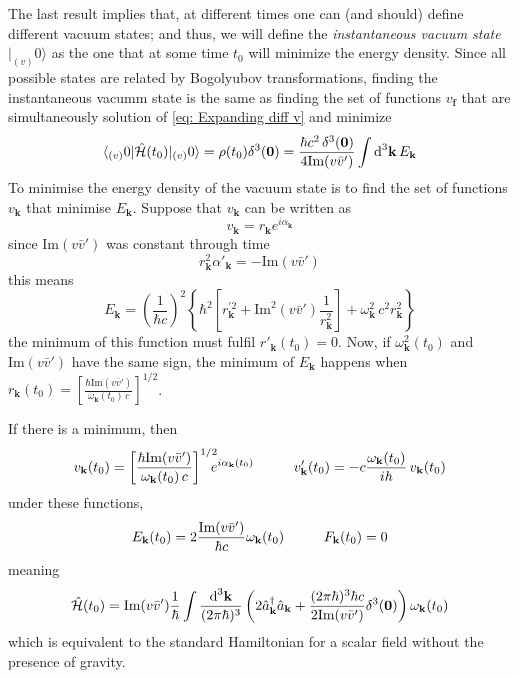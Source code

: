 The last result implies that, at different times one can (and should) define different vacuum states; and thus, we will define the \textit{instantaneous vacuum state} $|_{(v)}0\rangle$ as the one that at some time $t_0$ will minimize the energy density. Since all possible states are related by Bogolyubov transformations, finding the instantaneous vacumm state is the same as finding the set of functions $v_\mathbf{f}$ that are simultaneously solution of \ref{eq: Expanding diff v} and minimize
\begin{equation}
	\langle_{(v)}0|\hat{\mathcal{H}}(t_0)|_{(v)}0\rangle=\rho(t_0)\delta^3(\mathbf{0})=\frac{\hbar c^2 \,\delta^3(\mathbf{0})}{4\text{Im}(v\bar v')}\int\text{d}^3\mathbf{k}\,E_\mathbf{k}
\end{equation}
To minimise the energy density of the vacuum state is to find the set of functions $v_\mathbf{k}$ that minimise $E_\mathbf{k}$. Suppose that $v_\mathbf{k}$ can be written as
\begin{equation}
	v_\mathbf{k}=r_\mathbf{k}e^{i\alpha_\mathbf{k}}
\end{equation}
since Im$(v\bar v')$ was constant through time
\begin{equation}
	r_\mathbf{k}^2\alpha'_\mathbf{k}=-\text{Im}(v\bar v')
\end{equation}
this means
\begin{equation}
	E_\mathbf{k}=\left(\frac{1}{\hbar c}\right)^2\left\{\hbar^2\left[r^{'2}_\mathbf{k}+\text{Im}^2\left(v\bar v'\right)\frac{1}{r_\mathbf{k}^2}\right]+\omega^2_\mathbf{k}\,c^2r_\mathbf{k}^2\right\}
\end{equation}
the minimum of this function must fulfil $r'_\mathbf{k}(t_0)=0$. Now, if $\omega_\mathbf{k}^2(t_0)$ and $\text{Im}(v\bar v')$ have the same sign, the minimum of $E_\mathbf{k}$ happens when $r_\mathbf{k}(t_0)=\left[\frac{\hbar\text{Im}(v\bar v')}{\omega_\mathbf{k}(t_0)\,c}\right]^{1/2}$.

If there is a minimum, then
\begin{equation}
	v_\mathbf{k}(t_0)=\left[\frac{\hbar\text{Im}(v\bar v')}{\omega_\mathbf{k}(t_0)\,c}\right]^{1/2}\!\!\!\!e^{i\alpha_\mathbf{k}(t_0)}\hspace{1.0cm}v'_\mathbf{k}(t_0)=-c\frac{\omega_\mathbf{k}(t_0)}{ih}\,v_\mathbf{k}(t_0)
\end{equation}
under these functions,
\begin{equation}
	E_\mathbf{k}(t_0)=2\frac{\text{Im}(v\bar v')}{\hbar c}\omega_\mathbf{k}(t_0)\hspace{1.0cm}F_\mathbf{k}(t_0)=0
\end{equation}
meaning
\begin{equation}
	\hat{\mathcal{H}}(t_0)=\text{Im}(v\bar v')\frac{1}{\hbar}\int\frac{\text{d}^3\mathbf{k}}{(2\pi\hbar)^3}\left(2\hat{a}_\mathbf{k}^\dagger\hat{a}_\mathbf{k}+\frac{(2\pi\hbar)^3\hbar c}{2\text{Im}(v\bar v')}\delta^3(\mathbf{0})\right)\omega_\mathbf{k}(t_0)
\end{equation}
which is equivalent to the standard Hamiltonian for a scalar field without the presence of gravity.
